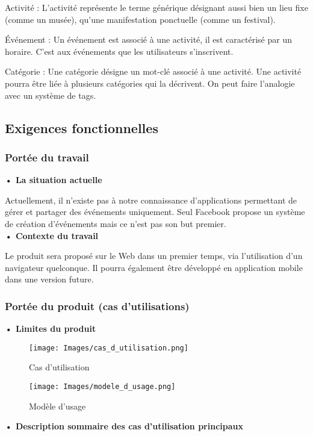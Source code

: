 Activité : L’activité représente le terme générique désignant aussi bien un lieu fixe (comme un musée), qu’une manifestation ponctuelle (comme un festival).

Événement : Un événement est associé à une activité, il est caractérisé par un horaire. C’est aux événements que les utilisateurs s’inscrivent.

Catégorie : Une catégorie désigne un mot-clé associé à une activité. Une activité pourra être liée à plusieurs catégories qui la décrivent. On peut faire l’analogie avec un système de tags.

\subsection{Exigences fonctionnelles}

\subsubsection{Portée du travail}

\textbf{• La situation actuelle}

Actuellement, il n’existe pas à notre connaissance d’applications permettant de gérer et partager des événements uniquement. Seul Facebook propose un système de création d’événements mais ce n’est pas son but premier. \\

\textbf{• Contexte du travail}

Le produit sera proposé sur le Web dans un premier temps, via l’utilisation d’un navigateur quelconque. Il pourra également être développé en application mobile dans une version future.

\subsubsection{Portée du produit (cas d’utilisations)}

\textbf{• Limites du produit}

\begin{figure}[H]
	\centerline{\texttt{[image: Images/cas\_d\_utilisation.png]}}
	\caption{Cas d'utilisation}
\end{figure}

\begin{figure}[H]
	\centerline{\texttt{[image: Images/modele\_d\_usage.png]}}
	\caption{Modèle d'usage}
\end{figure}


\textbf{• Description sommaire des cas d’utilisation principaux}

